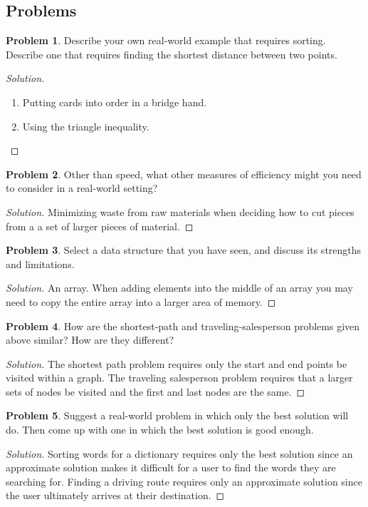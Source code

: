\documentclass[oneside]{book}
\theoremstyle{definition}
\newtheorem{problem}{Problem}[section]
\theoremstyle{plain}
\begin{document}
\begin{spacing}{1.618}
\subsection{Problems}

\begin{problem}
Describe your own real-world example that requires sorting. Describe one that requires finding the shortest distance between two points.
\begin{proof}[Solution] \ \par
	\begin{enumerate}
		\item Putting cards into order in a bridge hand. 
		\item Using the triangle inequality. 
	\end{enumerate}
\end{proof}
\end{problem}

\begin{problem}
	Other than speed, what other measures of efficiency might you need to consider in a real-world setting?
	\begin{proof}[Solution]
		Minimizing waste from raw materials when deciding how to cut pieces from a a set of larger pieces of material. 
	\end{proof}
\end{problem}

\begin{problem}
	Select a data structure that you have seen, and discuss its strengths and limitations.
	\begin{proof}[Solution]
		An array. When adding elements into the middle of an array you may need to copy the entire array into a larger area of memory. 
	\end{proof}
\end{problem}

\begin{problem}
	How are the shortest-path and traveling-salesperson problems given above similar?
	How are they different?
	\begin{proof}[Solution]
		The shortest path problem requires only the start and end points be visited within a graph. The traveling salesperson problem requires that a larger sets of nodes be visited and the first and last nodes are the same. 
	\end{proof}
\end{problem}

\begin{problem}
		Suggest a real-world problem in which only the best solution will do. Then come up with one in which the best solution is good enough.
	\begin{proof}[Solution]
		Sorting words for a dictionary requires only the best solution since an approximate solution makes it difficult for a user to find the words they are searching for. Finding a driving route requires only an approximate solution since the user ultimately arrives at their destination. 
	\end{proof}
\end{problem}


\end{spacing}
\end{document}
